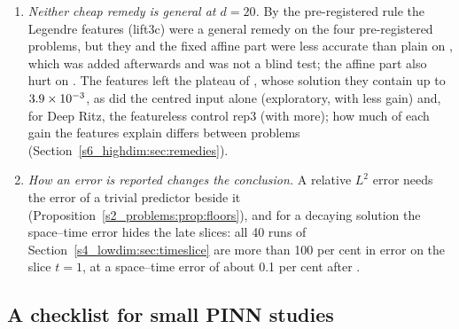\begin{enumerate}[label=(\arabic*),leftmargin=*]
Payne's classical constant; the theorem adds the order in $d$.
\item \emph{Neither cheap remedy is general at $d=20$.} By the pre-registered rule the Legendre
features (lift3c) were a general remedy on the four pre-registered problems, but they and the fixed
affine part were less accurate than plain on \Paltridge, which was added afterwards and was not a
blind test; the affine part also hurt on \Pridge. The features left the plateau of \Ptwo, whose
solution they contain up to $3.9\times 10^{-3}$, as did the centred input alone (exploratory, with
less gain) and, for Deep Ritz, the featureless control rep3 (with more); how much of each gain the
features explain differs between problems (Section~\ref{s6_highdim:sec:remedies}).
\item \emph{How an error is reported changes the conclusion.} A relative $L^2$ error needs the error
of a trivial predictor beside it (Proposition~\ref{s2_problems:prop:floors}), and for a decaying
solution the space--time error hides the late slices: all 40 runs of Section~\ref{s4_lowdim:sec:timeslice}
are more than 100 per cent in error on the slice $t=1$, at a space--time error of about 0.1 per cent
after \AdamLBFGS.
\end{enumerate}

\subsection{A checklist for small PINN studies}\label{s8_discussion:sec:checklist}


